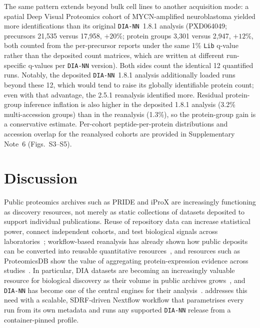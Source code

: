 \documentclass[preprint,12pt]{elsarticle}
\begin{document}
The same pattern extends beyond bulk cell lines to another acquisition mode: a spatial Deep Visual Proteomics cohort of MYCN-amplified neuroblastoma yielded more identifications than its original \texttt{DIA-NN}~1.8.1 analysis (PXD064049; precursors 21{,}535 versus 17{,}958, $+20$\%; protein groups 3{,}301 versus 2{,}947, $+12$\%, both counted from the per-precursor reports under the same 1\% \texttt{Lib} q-value rather than the deposited count matrices, which are written at different run-specific q-values per \texttt{DIA-NN} version). Both sides count the identical 12 quantified runs. Notably, the deposited \texttt{DIA-NN}~1.8.1 analysis additionally loaded runs beyond these 12, which would tend to raise its globally identifiable protein count; even with that advantage, the 2.5.1 reanalysis identified more. Residual protein-group inference inflation is also higher in the deposited 1.8.1 analysis (3.2\% multi-accession groups) than in the reanalysis (1.3\%), so the protein-group gain is a conservative estimate. Per-cohort peptide-per-protein distributions and accession overlap for the reanalysed cohorts are provided in Supplementary Note~6 (Figs.~S3--S5).

\section{Discussion}
\label{sec:discussion}
Public proteomics archives such as PRIDE and iProX are increasingly functioning as discovery resources, not merely as static collections of datasets deposited to support individual publications. Reuse of repository data can increase statistical power, connect independent cohorts, and test biological signals across laboratories~\cite{perezriverol2022reuse,hewapathirana2026datareuse}; workflow-based reanalysis has already shown how public deposits can be converted into reusable quantitative resources~\cite{dai2024quantms}, and resources such as ProteomicsDB show the value of aggregating protein-expression evidence across studies~\cite{lautenbacher2022proteomicsdb}. In particular, DIA datasets are becoming an increasingly valuable resource for biological discovery as their volume in public archives grows~\cite{perezriverol2025pride}, and \texttt{DIA-NN} has become one of the central engines for their analysis~\cite{demichev2020}. \quantmsdiann{} addresses this need with a scalable, SDRF-driven Nextflow workflow that parametrises every run from its own metadata and runs any supported \texttt{DIA-NN} release from a container-pinned profile.
\end{document}
